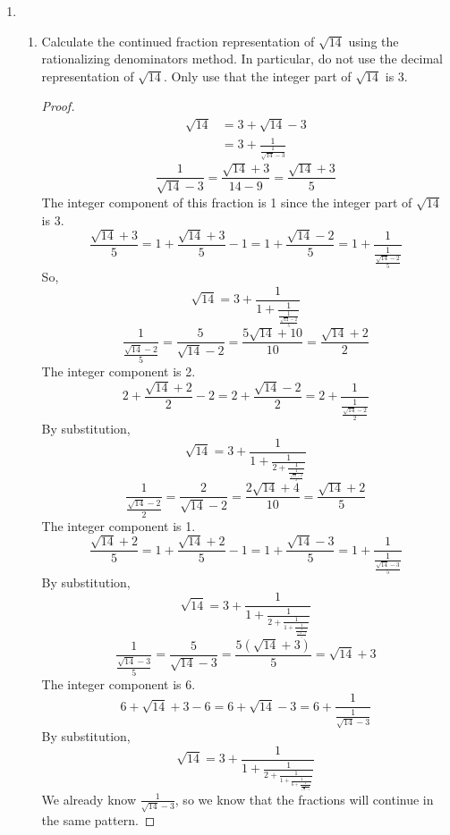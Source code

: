 \documentclass[11pt]{article}
\theoremstyle{definition}
\begin{document}
\begin{enumerate}
    \item
    \begin{enumerate} 
        \item Calculate the continued fraction representation of $\sqrt{14}$ using the rationalizing denominators method. In particular, do not use the decimal representation of $\sqrt{14}$. Only use that the integer part of $\sqrt{14}$ is 3.
        \begin{proof}
            \begin{align*}
                \sqrt{14} &= 3 + \sqrt{14} - 3 \\
                &= 3 + \frac{1}{\frac{1}{\sqrt{14} - 3}} 
            \end{align*}
            \[
                \frac{1}{\sqrt{14}-3} = \frac{\sqrt{14} + 3}{14-9} = \frac{\sqrt{14}+3}{5}
            \]
            The integer component of this fraction is 1 since the integer part of $\sqrt{14}$ is 3. 
            \[
                \frac{\sqrt{14} + 3}{5} = 1 + \frac{\sqrt{14} + 3}{5} - 1 = 1 + \frac{\sqrt{14}-2}{5} = 1 + \frac{1}{\frac{1}{\frac{\sqrt{14}-2}{5}}}
            \]
            So, 
            \[
                \sqrt{14} = 3 + \frac{1}{1 + \frac{1}{\frac{1}{\frac{\sqrt{14}-2}{5}}}}
            \]
            \[
                \frac{1}{\frac{\sqrt{14}-2}{5}} = \frac{5}{\sqrt{14}-2} = \frac{5\sqrt{14} + 10}{10} = \frac{\sqrt{14}+2}{2}
            \]
            The integer component is 2. 
            \[
                2 + \frac{\sqrt{14}+2}{2} - 2 = 2 + \frac{\sqrt{14}-2}{2} = 2 + \frac{1}{\frac{1}{\frac{\sqrt{14}-2}{2}}}
            \]
            By substitution, 
            \[
                \sqrt{14} = 3 + \frac{1}{1 + \frac{1}{2 + \frac{1}{\frac{1}{\frac{\sqrt{14}-2}{2}}}}}
            \]
            \[
                \frac{1}{\frac{\sqrt{14}-2}{2}} = \frac{2}{\sqrt{14}-2} = \frac{2\sqrt{14}+4}{10} = \frac{\sqrt{14}+2}{5}
            \]
            The integer component is 1.
            \[
                \frac{\sqrt{14}+2}{5} = 1 + \frac{\sqrt{14}+2}{5} - 1 = 1 + \frac{\sqrt{14}-3}{5} = 1 + \frac{1}{\frac{1}{\frac{\sqrt{14}-3}{5}}}
            \]
            By substitution, 
            \[
                \sqrt{14} = 3 + \frac{1}{1 + \frac{1}{2 + \frac{1}{1 + \frac{1}{\frac{1}{\frac{\sqrt{14}-3}{5}}}}}}
            \]
            \[
                \frac{1}{\frac{\sqrt{14}-3}{5}} = \frac{5}{\sqrt{14}-3} = \frac{5(\sqrt{14}+3)}{5} = \sqrt{14}+3
            \]
            The integer component is 6. 
            \[
                6 + \sqrt{14} + 3 - 6 = 6 + \sqrt{14}-3 = 6 + \frac{1}{\frac{1}{\sqrt{14}-3}}
            \]
            By substitution, 
            \[
                \sqrt{14} = 3 + \frac{1}{1 + \frac{1}{2 + \frac{1}{1 + \frac{1}{6 + \frac{1}{\frac{1}{\sqrt{14}-3}}}}}}
            \]
            We already know $\frac{1}{\sqrt{14}-3}$, so we know that the fractions will continue in the same pattern. 


\end{proof}
\end{enumerate}
\end{enumerate}
\end{document}
